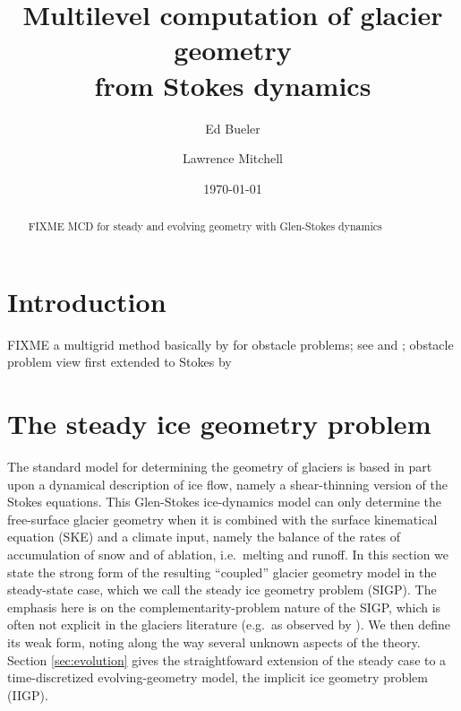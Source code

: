 \documentclass[letterpaper,final,12pt,reqno]{amsart}
\theoremstyle{claim}
\numberwithin{equation}{section}
\numberwithin{figure}{section}
\numberwithin{table}{section}
\numberwithin{theorem}{section}
\begin{document}
\title[Multilevel computation of glacier geometry from Stokes dynamics]{Multilevel computation of glacier geometry \\ from Stokes dynamics}

\author{Ed Bueler}

\author{Lawrence Mitchell}

\date{\today}

\begin{abstract} FIXME MCD for steady and evolving geometry with Glen-Stokes dynamics
\end{abstract}

\maketitle


\thispagestyle{empty}

\section{Introduction} \label{sec:intro}

FIXME a multigrid \cite{Trottenbergetal2001} method basically by \cite{Tai2003} for obstacle problems; see \cite{Bueler2022} and \cite{GraeserKornhuber2009};  obstacle problem view first extended to Stokes by \cite{WirbelJarosch2020}


\section{The steady ice geometry problem} \label{sec:stokesgeometry}

The standard model for determining the geometry of glaciers is based in part upon a dynamical description of ice flow, namely a shear-thinning version of the Stokes equations.  This Glen-Stokes ice-dynamics model can only determine the free-surface glacier geometry when it is combined with the surface kinematical equation (SKE) and a climate input, namely the balance of the rates of accumulation of snow and of ablation, i.e.~melting and runoff.  In this section we state the strong form of the resulting ``coupled'' glacier geometry model in the steady-state case, which we call the steady ice geometry problem (SIGP).  The emphasis here is on the complementarity-problem nature of the SIGP, which is often not explicit in the glaciers literature (e.g.~as observed by \cite{SchoofHewitt2013}).  We then define its weak form, noting along the way several unknown aspects of the theory.  Section \ref{sec:evolution} gives the straightfoward extension of the steady case to a time-discretized evolving-geometry model, the implicit ice geometry problem (IIGP).
\end{document}

